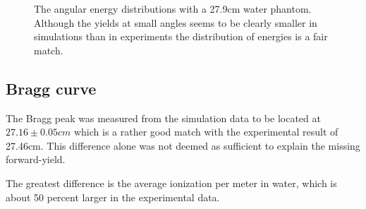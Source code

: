 \begin{figure}[!ht]
\centering
{}
\label{fig:subfigureExample}
\caption[Optional caption for list of figures]{The angular energy distributions with a 27.9cm water phantom. Although the yields at small angles seems to be clearly smaller in simulations than in experiments the distribution of energies is a fair match.}
\end{figure}

\subsection{Bragg curve}
The Bragg peak was measured from the simulation data to be located at $27.16 \pm 0.05 cm$ which is a rather good match with the experimental result of 27.46cm. This difference alone was not deemed as sufficient to explain the missing forward-yield.

The greatest difference is the average ionization per meter in water, which is about 50 percent larger in the experimental data. %


